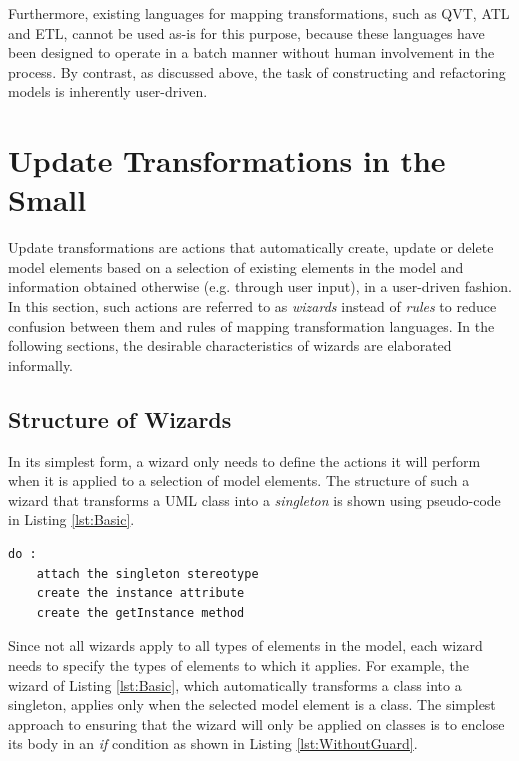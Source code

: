 Furthermore, existing languages for mapping transformations, such as QVT, ATL and ETL, cannot be used as-is for this purpose, because these languages have been designed to operate in a batch manner without human involvement in the process. By contrast, as discussed above, the task of constructing and refactoring models is inherently user-driven.

\section{Update Transformations in the Small}
\label{sec:ModelTransformationInTheSmall}

Update transformations are actions that automatically create, update or delete model elements based on a selection of existing elements in the model and information obtained otherwise (e.g. through user input), in a user-driven fashion. In this section, such actions are referred to as \textit{wizards} instead of \textit{rules} to reduce confusion between them and rules of mapping transformation languages. In the following sections, the desirable characteristics of wizards are elaborated informally. 

\subsection{Structure of Wizards}

In its simplest form, a wizard only needs to define the actions it will perform when it is applied to a selection of model elements. The structure of such a wizard that transforms a UML class into a \textit{singleton} is shown using pseudo-code in Listing \ref{lst:Basic}.\\

\begin{lstlisting}[caption=The simplest form of a wizard for refactoring a class into a singleton, label=lst:Basic, language=EWL]
do :
	attach the singleton stereotype
	create the instance attribute
	create the getInstance method
\end{lstlisting}

Since not all wizards apply to all types of elements in the model, each wizard needs to specify the types of elements to which it applies. For example, the wizard of Listing \ref{lst:Basic}, which automatically transforms a class into a singleton, applies only when the selected model element is a class. The simplest approach to ensuring that the wizard will only be applied on classes is to enclose its body in an \emph{if} condition as shown in Listing \ref{lst:WithoutGuard}.


